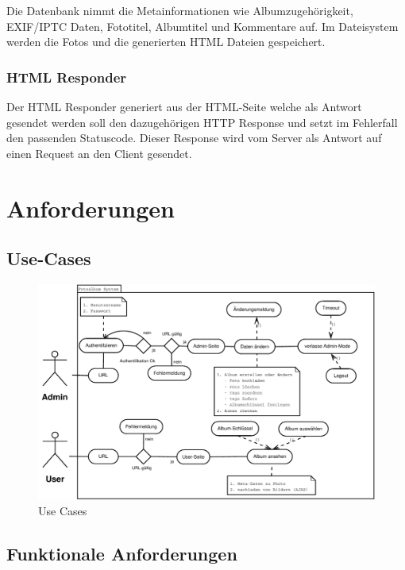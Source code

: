 \documentclass[a4paper,12pt,liststotocnumbered]{scrartcl}
\begin{document}
Die Datenbank nimmt die Metainformationen wie Albumzugehörigkeit, EXIF/IPTC
Daten, Fototitel, Albumtitel und Kommentare auf. Im Dateisystem werden die
Fotos und die generierten HTML Dateien gespeichert.

\subsubsection{HTML Responder}

Der HTML Responder generiert aus der HTML-Seite welche als Antwort gesendet
werden soll den dazugehörigen HTTP Response und setzt im Fehlerfall den
passenden Statuscode. Dieser Response wird vom Server als Antwort auf einen
Request an den Client gesendet.

\newpage
\section{Anforderungen}
\subsection{Use-Cases}

\begin{figure}[bh]
	\begin{center}
		\includegraphics[width=\textwidth]{usecases}
		\caption{Use Cases}
		\label{usecases}
	\end{center}
\end{figure}

\newpage

\subsection{Funktionale Anforderungen}
\end{document}
